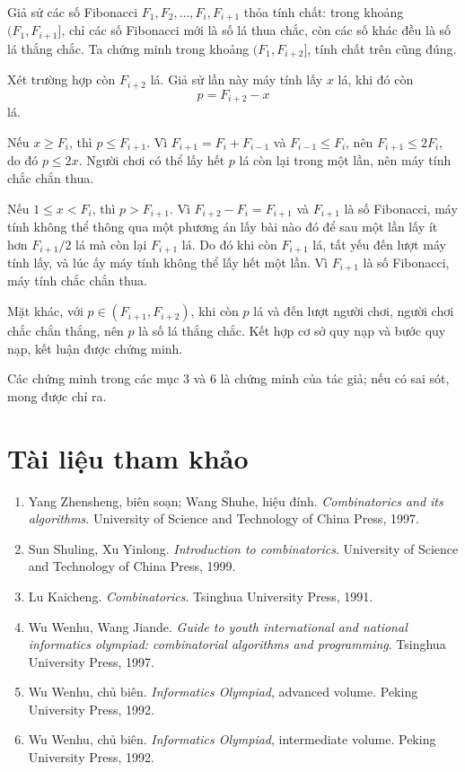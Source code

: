 \documentclass[11pt]{article}
\begin{document}
\begin{enumerate}
  Giả sử các số Fibonacci \(F_1,F_2,\ldots,F_i,F_{i+1}\) thỏa tính chất: trong
  khoảng \((F_1,F_{i+1}]\), chỉ các số Fibonacci mới là số lá thua chắc, còn
  các số khác đều là số lá thắng chắc. Ta chứng minh trong khoảng
  \((F_1,F_{i+2}]\), tính chất trên cũng đúng.

  Xét trường hợp còn \(F_{i+2}\) lá. Giả sử lần này máy tính lấy \(x\) lá,
  khi đó còn
  \[
    p=F_{i+2}-x
  \]
  lá.

  Nếu \(x\ge F_i\), thì \(p\le F_{i+1}\). Vì
  \(F_{i+1}=F_i+F_{i-1}\) và \(F_{i-1}\le F_i\), nên
  \(F_{i+1}\le2F_i\), do đó \(p\le2x\). Người chơi có thể lấy hết \(p\) lá
  còn lại trong một lần, nên máy tính chắc chắn thua.

  Nếu \(1\le x<F_i\), thì \(p>F_{i+1}\). Vì
  \(F_{i+2}-F_i=F_{i+1}\) và \(F_{i+1}\) là số Fibonacci, máy tính không thể
  thông qua một phương án lấy bài nào đó để sau một lần lấy ít hơn
  \(F_{i+1}/2\) lá mà còn lại \(F_{i+1}\) lá. Do đó khi còn \(F_{i+1}\) lá,
  tất yếu đến lượt máy tính lấy, và lúc ấy máy tính không thể lấy hết một
  lần. Vì \(F_{i+1}\) là số Fibonacci, máy tính chắc chắn thua.

  Mặt khác, với \(p\in(F_{i+1},F_{i+2})\), khi còn \(p\) lá và đến lượt người
  chơi, người chơi chắc chắn thắng, nên \(p\) là số lá thắng chắc. Kết hợp cơ
  sở quy nạp và bước quy nạp, kết luận được chứng minh.
\end{enumerate}

Các chứng minh trong các mục 3 và 6 là chứng minh của tác giả; nếu có sai
sót, mong được chỉ ra.

\section{Tài liệu tham khảo}

\begin{enumerate}
  \item Yang Zhensheng, biên soạn; Wang Shuhe, hiệu đính. \emph{Combinatorics
  and its algorithms}. University of Science and Technology of China Press,
  1997.
  \item Sun Shuling, Xu Yinlong. \emph{Introduction to combinatorics}.
  University of Science and Technology of China Press, 1999.
  \item Lu Kaicheng. \emph{Combinatorics}. Tsinghua University Press, 1991.
  \item Wu Wenhu, Wang Jiande. \emph{Guide to youth international and national
  informatics olympiad: combinatorial algorithms and programming}. Tsinghua
  University Press, 1997.
  \item Wu Wenhu, chủ biên. \emph{Informatics Olympiad}, advanced volume.
  Peking University Press, 1992.
  \item Wu Wenhu, chủ biên. \emph{Informatics Olympiad}, intermediate volume.
  Peking University Press, 1992.
\end{enumerate}
\end{document}
